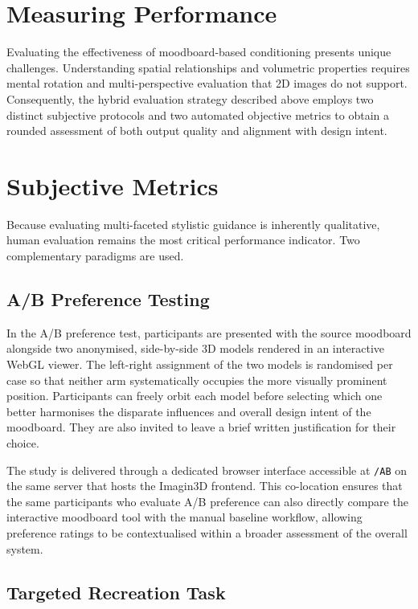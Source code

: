 \section{Measuring Performance}

Evaluating the effectiveness of moodboard-based conditioning presents unique challenges. Understanding spatial relationships and volumetric properties requires mental rotation and multi-perspective evaluation that 2D images do not support. Consequently, the hybrid evaluation strategy described above employs two distinct subjective protocols and two automated objective metrics to obtain a rounded assessment of both output quality and alignment with design intent.

\section{Subjective Metrics}

Because evaluating multi-faceted stylistic guidance is inherently qualitative, human evaluation remains the most critical performance indicator. Two complementary paradigms are used.

\subsection{A/B Preference Testing}

In the A/B preference test, participants are presented with the source moodboard alongside two anonymised, side-by-side 3D models rendered in an interactive WebGL viewer. The left-right assignment of the two models is randomised per case so that neither arm systematically occupies the more visually prominent position. Participants can freely orbit each model before selecting which one better harmonises the disparate influences and overall design intent of the moodboard. They are also invited to leave a brief written justification for their choice.

The study is delivered through a dedicated browser interface accessible at \texttt{/AB} on the same server that hosts the Imagin3D frontend. This co-location ensures that the same participants who evaluate A/B preference can also directly compare the interactive moodboard tool with the manual baseline workflow, allowing preference ratings to be contextualised within a broader assessment of the overall system.

\subsection{Targeted Recreation Task}

